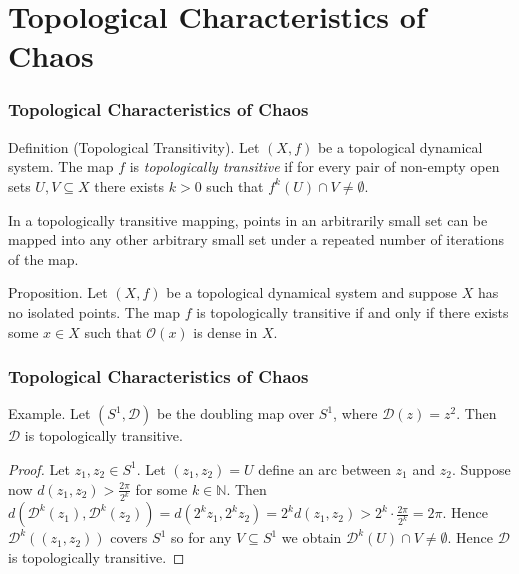 \documentclass{beamer}
\begin{document}
\section{Topological Characteristics of Chaos}
\begin{frame}
    \frametitle{Topological Characteristics of Chaos}
    \begin{block}{Definition (Topological Transitivity).}
        Let $(X, f)$ be a topological dynamical system. The map $f$ is \emph{topologically transitive} if for every pair of non-empty open sets $U, V \subseteq X$ there exists $k > 0$ such that $f^k(U) \cap V \neq \emptyset$.
    \end{block}
    \vspace{0.3cm}
    In a topologically transitive mapping, points in an arbitrarily small set can be mapped into any other arbitrary small set under a repeated number of iterations of the map.
    \vspace{0.3cm}
    \begin{block}{Proposition.}
        Let $(X, f)$ be a topological dynamical system and suppose $X$ has no isolated points. The map $f$ is topologically transitive if and only if there exists some $x \in X$ such that $\mathcal{O}(x)$ is dense in $X$. \cite{silverman}
    \end{block}
\end{frame}

\begin{frame}
    \frametitle{Topological Characteristics of Chaos}
    \begin{block}{Example.}
        Let $(S^1, \mathcal{D})$ be the doubling map over $S^1$, where $\mathcal{D}(z) = z^2$. Then $\mathcal{D}$ is topologically transitive.
        \begin{proof}
            Let $z_1, z_2 \in S^1$. Let $(z_1, z_2) = U$ define an arc between $z_1$ and $z_2$. Suppose now $d\left(z_1, z_2\right) > \frac{2\pi}{2^k}$ for some $k \in \mathbb{N}$. Then $d\left(\mathcal{D}^k(z_1), \mathcal{D}^k(z_2)\right) = d\left( 2^k z_1, 2^k z_2 \right) = 2^k d\left( z_1, z_2 \right) > 2^k \cdot \frac{2\pi}{2^k} = 2\pi$. Hence $\mathcal{D}^k((z_1, z_2))$ covers $S^1$ so for any $V \subseteq S^1$ we obtain $\mathcal{D}^k(U) \cap V \neq \emptyset$. Hence $\mathcal{D}$ is topologically transitive.
        \end{proof}
    \end{block}
\end{frame}
\end{document}
